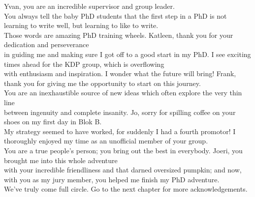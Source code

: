 Yvan, you are an incredible supervisor and group leader.\\You always tell the baby PhD students that the first step in a PhD
is not learning to write well, but learning to like to write.\\Those words are amazing PhD training wheels.
Katleen, thank you for your dedication and perseverance\\in guiding me and making sure I got off to a good start in my PhD.
I see exciting times ahead for the KDP group, which is overflowing\\with enthusiasm and inspiration. I wonder what the future will bring!
Frank, thank you for giving me the opportunity to start on this journey.\\You are an inexhaustible source of new ideas
which often explore the very thin line\\between ingenuity and complete insanity.
Jo, sorry for spilling coffee on your shoes on my first day in Blok B.\\My strategy seemed to have worked, for suddenly I had a fourth promotor!
I thoroughly enjoyed my time as an unofficial member of your group.\\You are a true people's person; you bring out the best in everybody.
Joeri, you brought me into this whole adventure\\with your incredible friendliness and that darned oversized pumpkin;
and now, with you as my jury member, you helped me finish my PhD adventure.\\We've truly come full circle.
Go to the next chapter for more acknowledgements.





















































